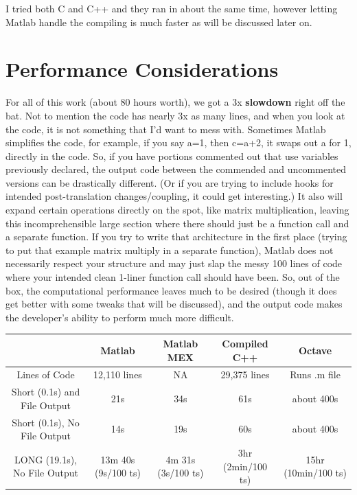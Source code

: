 \documentclass{article}
\begin{document}
I tried both C and C++ and they ran in about the same time, however letting Matlab handle the compiling is much faster as will be discussed later on.\\


\section{Performance Considerations}

For all of this work (about 80 hours worth), we got a 3x \textbf{slowdown} right off the bat.  Not to mention the code has nearly 3x as many lines, and when you look at the code, it is not something that I'd want to mess with.  Sometimes Matlab simplifies the code, for example, if you say a=1, then c=a+2, it swaps out a for 1, directly in the code.  So, if you have portions commented out that use variables previously declared, the output code between the commended and uncommented versions can be drastically different. (Or if you are trying to include hooks for intended post-translation changes/coupling, it could get interesting.)  It also will expand certain operations directly on the spot, like matrix multiplication, leaving this incomprehensible large section where there should just be a function call and a separate function.  If you try to write that architecture in the first place (trying to put that example matrix multiply in a separate function), Matlab does not necessarily respect your structure and may just slap the messy 100 lines of code where your intended clean 1-liner function call should have been.  So, out of the box, the computational performance leaves much to be desired (though it does get better with some tweaks that will be discussed), and the output code makes the developer's ability to perform much more difficult.


\begin{center}
\begin{tabular}{|c| c c c c|}
 \hline
& Matlab & Matlab MEX & Compiled C++ & Octave \\
 \hline
Lines of Code & 12,110 lines  & NA & 29,375 lines & Runs .m file \\
\hline
Short (0.1s) and File Output & 21s & 34s & 61s & about 400s \\
\hline
Short (0.1s), No File Output & 14s & 19s & 60s & about 400s \\
\hline
LONG (19.1s), No File Output & 13m 40s (9s/100 ts) & 4m 31s (3s/100 ts) & 3hr (2min/100 ts) & 15hr (10min/100 ts) \\
\hline
\end{tabular}
\end{center}
\end{document}
